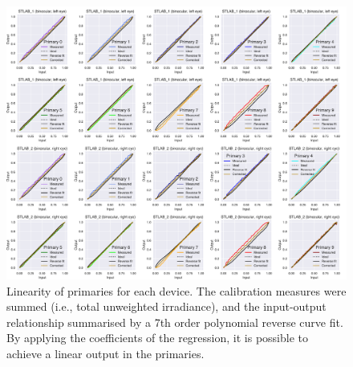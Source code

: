 \documentclass[
]{article}
\begin{document}
\begin{figure}

{\centering \includegraphics{Figures/gamma_figure} 

}

\caption{Linearity of primaries for each device. The calibration measures were summed (i.e., total unweighted irradiance), and the input-output relationship summarised by a 7th order polynomial reverse curve fit. By applying the coefficients of the regression, it is possible to achieve a linear output in the primaries.}\label{fig:primarylinearity}
\end{figure}
\end{document}
